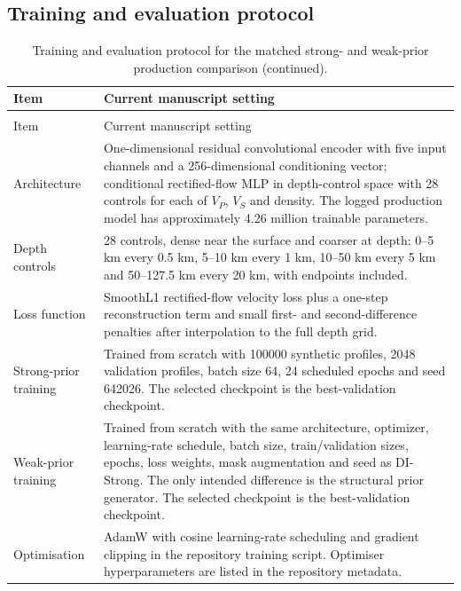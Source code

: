 \documentclass[referee]{gji}
\begin{document}
\subsection{Training and evaluation protocol}

\small
\begin{longtable}{@{}p{}p{}@{}}
\caption{Training and evaluation protocol for the matched strong- and weak-prior production comparison.}
\label{tab:trainingprotocol}\\
\toprule
Item & Current manuscript setting \\
\midrule
\endfirsthead
\caption[]{Training and evaluation protocol for the matched strong- and weak-prior production comparison (continued).}\\
\toprule
Item & Current manuscript setting \\
\midrule
\endhead
\bottomrule
\endfoot
Architecture & One-dimensional residual convolutional encoder with five input channels and a 256-dimensional conditioning vector; conditional rectified-flow MLP in depth-control space with 28 controls for each of $V_P$, $V_S$ and density. The logged production model has approximately 4.26 million trainable parameters. \\
Depth controls & 28 controls, dense near the surface and coarser at depth: 0--5 km every 0.5 km, 5--10 km every 1 km, 10--50 km every 5 km and 50--127.5 km every 20 km, with endpoints included. \\
Loss function & SmoothL1 rectified-flow velocity loss plus a one-step reconstruction term and small first- and second-difference penalties after interpolation to the full depth grid. \\
Strong-prior training & Trained from scratch with 100000 synthetic profiles, 2048 validation profiles, batch size 64, 24 scheduled epochs and seed 642026. The selected checkpoint is the best-validation checkpoint. \\
Weak-prior training & Trained from scratch with the same architecture, optimizer, learning-rate schedule, batch size, train/validation sizes, epochs, loss weights, mask augmentation and seed as DI-Strong. The only intended difference is the structural prior generator. The selected checkpoint is the best-validation checkpoint. \\
Optimisation & AdamW with cosine learning-rate scheduling and gradient clipping in the repository training script. Optimiser hyperparameters are listed in the repository metadata. \\

\end{longtable}
\end{document}
